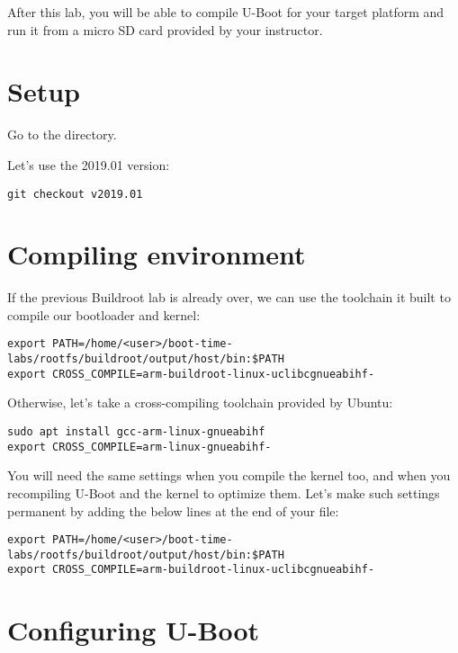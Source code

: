 
After this lab, you will be able to compile U-Boot for your target
platform and run it from a micro SD card provided by your instructor.

\section{Setup}

Go to the  directory.

Let's use the 2019.01 version:
\begin{verbatim}
git checkout v2019.01
\end{verbatim}

\section{Compiling environment}

If the previous Buildroot lab is already over, we can use the
toolchain it built to compile our bootloader and kernel:

\begin{verbatim}
export PATH=/home/<user>/boot-time-labs/rootfs/buildroot/output/host/bin:$PATH
export CROSS_COMPILE=arm-buildroot-linux-uclibcgnueabihf-
\end{verbatim}

Otherwise, let's take a cross-compiling toolchain provided by Ubuntu:

\begin{verbatim}
sudo apt install gcc-arm-linux-gnueabihf
export CROSS_COMPILE=arm-linux-gnueabihf-
\end{verbatim}

You will need the same settings when you compile the kernel too, and
when you recompiling U-Boot and the kernel to optimize them. Let's make
such settings permanent by adding the below lines at the end of your
 file:

\begin{verbatim}
export PATH=/home/<user>/boot-time-labs/rootfs/buildroot/output/host/bin:$PATH
export CROSS_COMPILE=arm-buildroot-linux-uclibcgnueabihf-
\end{verbatim}

\section{Configuring U-Boot}

